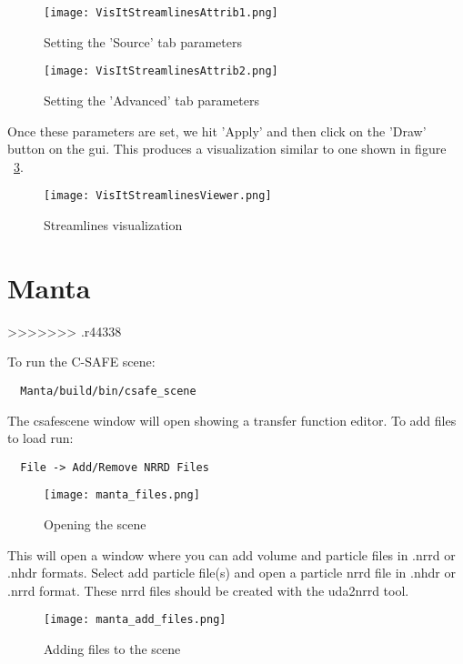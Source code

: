\begin{figure}
  \center
  \texttt{[image: VisItStreamlinesAttrib1.png]}
  \caption{Setting the 'Source' tab parameters}
  \label{VisItStreamlinesAttrib1}
\end{figure}

\begin{figure}
  \center
  \texttt{[image: VisItStreamlinesAttrib2.png]}
  \caption{Setting the 'Advanced' tab parameters}
  \label{VisItStreamlinesAttrib2}
\end{figure}

Once these parameters are set, we hit 'Apply' and then click on the 'Draw' button on the gui. This produces a visualization similar to one shown in figure ~\ref{VisItStreamlinesViewer}.

\begin{figure}
  \center
  \texttt{[image: VisItStreamlinesViewer.png]}
  \caption{Streamlines visualization}
  \label{VisItStreamlinesViewer}
\end{figure}

\chapter{Manta}
>>>>>>> .r44338

To run the C-SAFE scene: 
\begin{Verbatim}
  Manta/build/bin/csafe_scene
\end{Verbatim}

The csafescene window will open showing a transfer function editor.  To add files to load run:
\begin{Verbatim}
  File -> Add/Remove NRRD Files
\end{Verbatim}

\begin{figure}[htbp]
  \center
  \texttt{[image: manta\_files.png]}
  \caption{Opening the scene}
  \label{fig:manta_files}
\end{figure}

This will open a window where you can add volume and particle files in .nrrd or .nhdr formats.  Select add particle file(s) and open a particle nrrd file in .nhdr or .nrrd format.  These nrrd files should be created with the uda2nrrd tool.

\begin{figure}[htbp]
  \center
  \texttt{[image: manta\_add\_files.png]}
  \caption{Adding files to the scene}
  \label{fig:manta_add_files}
\end{figure}

